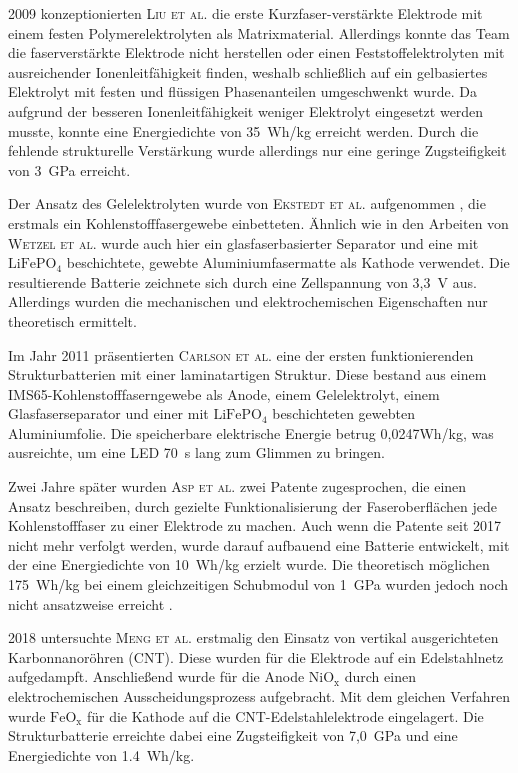 2009 konzeptionierten \textsc{Liu et al.} \cite{Liu2009} die erste Kurzfaser-verstärkte Elektrode mit einem festen Polymerelektrolyten als Matrixmaterial. Allerdings konnte das Team die faserverstärkte Elektrode nicht herstellen oder einen Feststoffelektrolyten mit ausreichender Ionenleitfähigkeit finden, weshalb schließlich auf ein gelbasiertes Elektrolyt mit festen und flüssigen Phasenanteilen umgeschwenkt wurde. Da aufgrund der besseren Ionenleitfähigkeit weniger Elektrolyt eingesetzt werden musste, konnte eine Energiedichte von 35~Wh/kg erreicht werden. Durch die fehlende strukturelle Verstärkung wurde allerdings nur eine geringe Zugsteifigkeit von 3~GPa erreicht.

Der Ansatz des Gelelektrolyten wurde von \textsc{Ekstedt et al.} aufgenommen \cite{Ekstedt2010}, die erstmals ein Kohlenstofffasergewebe einbetteten. Ähnlich wie in den Arbeiten von \textsc{Wetzel et al.} wurde auch hier ein glasfaserbasierter Separator und eine mit $\text{LiFePO}_\text{4}$ beschichtete, gewebte Aluminiumfasermatte als Kathode verwendet. Die resultierende Batterie zeichnete sich durch eine Zellspannung von 3,3~V aus. Allerdings wurden die mechanischen und elektrochemischen Eigenschaften nur theoretisch ermittelt.

Im Jahr 2011 präsentierten \textsc{Carlson et al.} \cite{Carlson2011} eine der ersten funktionierenden Strukturbatterien mit einer laminatartigen Struktur. Diese bestand aus einem IMS65-Kohlenstofffaserngewebe als Anode, einem Gelelektrolyt, einem Glasfaserseparator und einer mit $\text{LiFePO}_\text{4}$ beschichteten gewebten Aluminiumfolie. Die speicherbare elektrische Energie betrug 0,0247Wh/kg, was ausreichte, um eine LED 70~s lang zum Glimmen zu bringen.

Zwei Jahre später wurden \textsc{Asp et al.} \cite{Asp2013US,Asp2013CN} zwei Patente zugesprochen, die einen Ansatz beschreiben, durch gezielte Funktionalisierung der Faseroberflächen jede Kohlenstofffaser zu einer Elektrode zu machen. Auch wenn die Patente seit 2017 nicht mehr verfolgt werden, wurde darauf aufbauend eine Batterie entwickelt, mit der eine Energiedichte von 10~Wh/kg erzielt wurde. Die theoretisch möglichen 175~Wh/kg bei einem gleichzeitigen Schubmodul von 1~GPa wurden jedoch noch nicht ansatzweise erreicht \cite{Leijonmarck2013, Carlson2013}.

2018 untersuchte \textsc{Meng et al.} \cite{Meng2018} erstmalig den Einsatz von vertikal ausgerichteten Karbonnanoröhren (CNT). Diese wurden für die Elektrode auf ein Edelstahlnetz aufgedampft. Anschließend wurde für die Anode $\text{NiO}_\text{x}$ durch einen elektrochemischen Ausscheidungsprozess aufgebracht. Mit dem gleichen Verfahren wurde $\text{FeO}_\text{x}$ für die Kathode auf die CNT-Edelstahlelektrode eingelagert. Die Strukturbatterie erreichte dabei eine Zugsteifigkeit von 7,0~GPa und eine Energiedichte von 1.4~Wh/kg.

